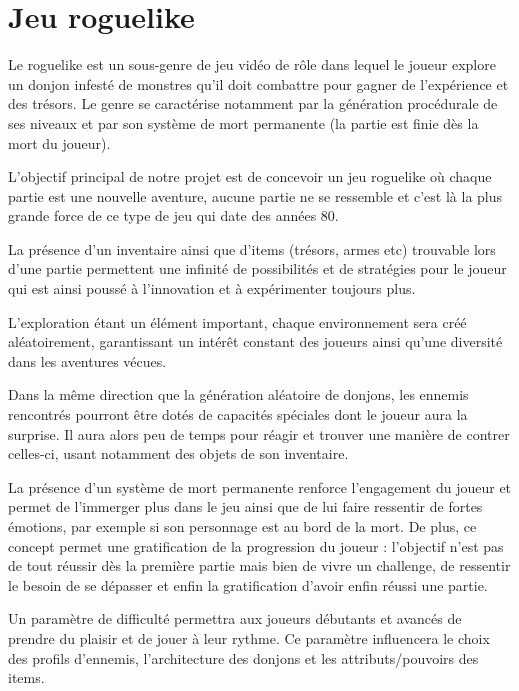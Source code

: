 \documentclass{article}
\begin{document}
\newpage

\section{Jeu roguelike}

Le roguelike est un sous-genre de jeu vidéo de rôle dans lequel le joueur explore un donjon infesté de monstres qu'il doit combattre pour gagner de l'expérience et des trésors. Le genre se caractérise notamment par la génération procédurale de ses niveaux et par son système de mort permanente (la partie est finie dès la mort du joueur). \bigskip

L'objectif principal de notre projet est de concevoir un jeu roguelike où chaque partie est une nouvelle aventure, aucune partie ne se ressemble et c'est là la plus grande force de ce type de jeu qui date des années 80. \bigskip

La présence d'un inventaire ainsi que d'items (trésors, armes etc) trouvable lors d'une partie permettent une infinité de possibilités et de stratégies pour le joueur qui est ainsi poussé à l'innovation et à expérimenter toujours plus. \bigskip

L'exploration étant un élément important, chaque environnement sera créé aléatoirement, garantissant un intérêt constant des joueurs ainsi qu'une diversité dans les aventures vécues. \bigskip

Dans la même direction que la génération aléatoire de donjons, les ennemis rencontrés pourront être dotés de capacités spéciales dont le joueur aura la surprise. Il aura alors peu de temps pour réagir et trouver une manière de contrer celles-ci, usant notamment des objets de son inventaire. \bigskip

La présence d'un système de mort permanente renforce l'engagement du joueur et permet de l'immerger plus dans le jeu ainsi que de lui faire ressentir de fortes émotions, par exemple si son personnage est au bord de la mort. De plus, ce concept permet une gratification de la progression du joueur : l'objectif n'est pas de tout réussir dès la première partie mais bien de vivre un challenge, de ressentir le besoin de se dépasser et enfin la gratification d'avoir enfin réussi une partie. \bigskip

Un paramètre de difficulté permettra aux joueurs débutants et avancés de prendre du plaisir et de jouer à leur rythme. Ce paramètre influencera le choix des profils d'ennemis, l'architecture des donjons et les attributs/pouvoirs des items.
\end{document}
